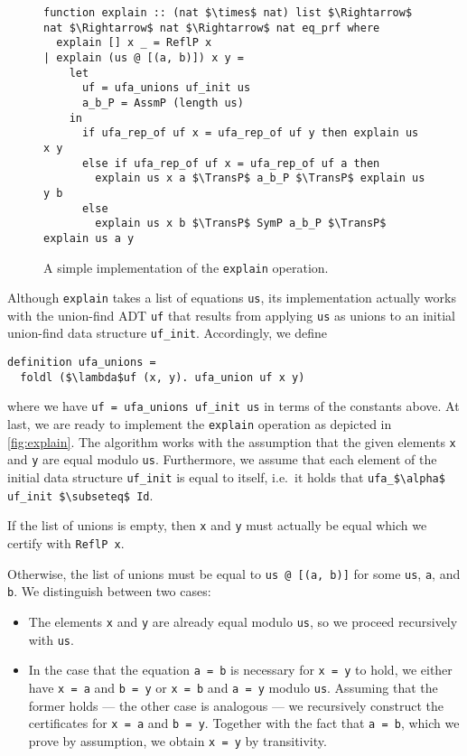 \documentclass[
  sigplan,
  10pt,
  anonymous,
  review,
  ]{acmart}
\newcommand{\TransP}{\bigtriangledown}
\begin{document}
\begin{figure*}
  \centering
  \begin{lstlisting}
function explain :: (nat $\times$ nat) list $\Rightarrow$ nat $\Rightarrow$ nat $\Rightarrow$ nat eq_prf where
  explain [] x _ = ReflP x
| explain (us @ [(a, b)]) x y =
    let
      uf = ufa_unions uf_init us
      a_b_P = AssmP (length us)
    in
      if ufa_rep_of uf x = ufa_rep_of uf y then explain us x y
      else if ufa_rep_of uf x = ufa_rep_of uf a then
        explain us x a $\TransP$ a_b_P $\TransP$ explain us y b
      else
        explain us x b $\TransP$ SymP a_b_P $\TransP$ explain us a y
  \end{lstlisting}
  \caption{A simple implementation of the \lstinline|explain| operation.\label{fig:explain}}
\end{figure*}
Although \lstinline|explain| takes a list of equations \lstinline|us|, its implementation actually works with the union-find ADT \lstinline|uf| that results from applying \lstinline|us| as unions to an initial union-find data structure \lstinline|uf_init|.
Accordingly, we define
\begin{lstlisting}
definition ufa_unions =
  foldl ($\lambda$uf (x, y). ufa_union uf x y)
\end{lstlisting}
where we have \lstinline|uf = ufa_unions uf_init us| in terms of the constants above.
At last, we are ready to implement the \lstinline|explain| operation as depicted in \autoref{fig:explain}.
The algorithm works with the assumption that the given elements \lstinline|x| and \lstinline|y| are equal modulo \lstinline|us|.
Furthermore, we assume that each element of the initial data structure \lstinline|uf_init| is equal to itself, i.e.\ it holds that \lstinline|ufa_$\alpha$ uf_init $\subseteq$ Id|.

If the list of unions is empty, then \lstinline|x| and \lstinline|y| must actually be equal which we certify with \lstinline|ReflP x|.

Otherwise, the list of unions must be equal to \lstinline|us @ [(a, b)]| for some \lstinline|us|, \lstinline|a|, and \lstinline|b|.
We distinguish between two cases:
\begin{itemize}
  \item The elements \lstinline|x| and \lstinline|y| are already equal modulo \lstinline|us|, so we proceed recursively with \lstinline|us|.
  \item In the case that the equation \lstinline|a = b| is necessary for \lstinline|x = y| to hold, we either have \lstinline|x = a| and \lstinline|b = y| or \lstinline|x = b| and \lstinline|a = y| modulo \lstinline|us|.
    Assuming that the former holds --- the other case is analogous --- we recursively construct the certificates for \lstinline|x = a| and \lstinline|b = y|.
    Together with the fact that \lstinline|a = b|, which we prove by assumption, we obtain \lstinline|x = y| by transitivity.
\end{itemize}
\end{document}
